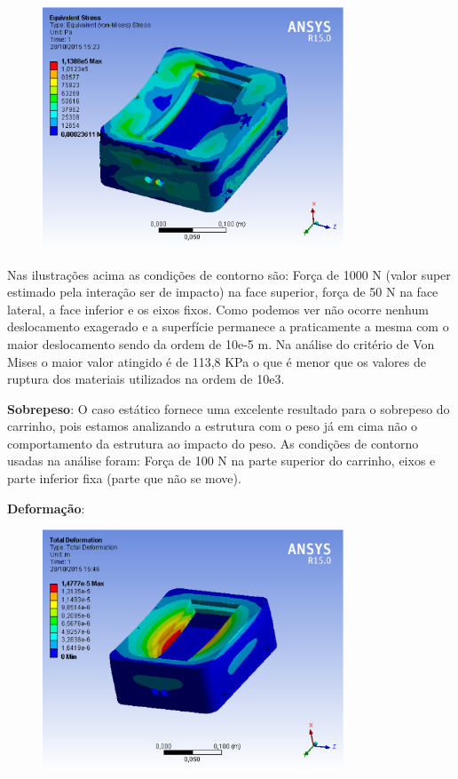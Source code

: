 \begin{figure}[H]
    \centering
    \includegraphics[width=0.8\textwidth]{figuras/vonmises_1000n.eps}
    \caption{}
    \label{fig:von1000}
\end{figure}

Nas ilustrações acima as condições de contorno são: Força de 1000 N (valor super estimado pela interação ser de impacto) na face superior,
força de 50 N na face lateral, a face inferior e os eixos fixos. Como podemos ver não ocorre nenhum deslocamento exagerado e a superfície
permanece a praticamente a mesma com o maior deslocamento sendo da ordem de 10e-5 m. Na análise do critério de Von Mises o maior valor
atingido é de 113,8 KPa o que é menor que os valores de ruptura dos materiais utilizados  na ordem de 10e3.
 
\textbf{Sobrepeso}: O caso estático fornece uma excelente resultado para o sobrepeso do carrinho, pois estamos analizando a estrutura com
o peso já em cima não o comportamento da estrutura ao impacto do peso. As condições de contorno usadas na análise foram: Força de 100 N
na parte superior do carrinho, eixos e parte inferior fixa (parte que não se move).
 
\textbf{Deformação}:

\begin{figure}[H]
    \centering
    \includegraphics[width=0.8\textwidth]{figuras/deformacao_peso100n.eps}
    \caption{}
    \label{fig:def100}
\end{figure}

